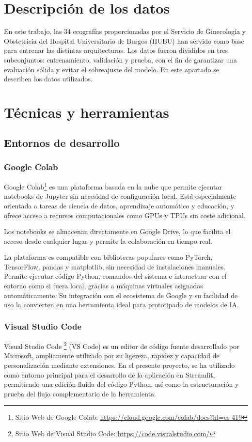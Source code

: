 
\section{Descripción de los datos}
En este trabajo, las 34 ecografías proporcionadas por el Servicio de Ginecología y Obstetricia del Hospital Universitario de Burgos (HUBU) han servido como base para entrenar las distintas arquitecturas. Los datos fueron divididos en tres subconjuntos: entrenamiento, validación y prueba, con el fin de garantizar una evaluación sólida y evitar el sobreajuste del modelo. En este apartado se describen los datos utilizados.
 
\section{Técnicas y herramientas}
\subsection{Entornos de desarrollo}
\subsubsection{Google Colab}
Google Colab\footnote{Sitio Web de Google Colab: \url{https://cloud.google.com/colab/docs?hl=es-419}} es una plataforma basada en la nube que permite ejecutar notebooks de Jupyter sin necesidad de configuración local. Está especialmente orientada a tareas de ciencia de datos, aprendizaje automático y educación, y ofrece acceso a recursos computacionales como GPUs y TPUs sin coste adicional. 

Los notebooks se almacenan directamente en Google Drive, lo que facilita el acceso desde cualquier lugar y permite la colaboración en tiempo real.

La plataforma es compatible con bibliotecas populares como PyTorch, TensorFlow, pandas y matplotlib, sin necesidad de instalaciones manuales. Permite ejecutar código Python, comandos del sistema e interactuar con el entorno como si fuera local, gracias a máquinas virtuales asignadas automáticamente. Su integración con el ecosistema de Google y su facilidad de uso la convierten en una herramienta ideal para prototipado de modelos de IA.

\subsubsection{Visual Studio Code}
Visual Studio Code \footnote{Sitio Web de Visual Studio Code: \url{https://code.visualstudio.com/}} (VS Code) es un editor de código fuente desarrollado por Microsoft, ampliamente utilizado por su ligereza, rapidez y capacidad de personalización mediante extensiones. En el presente proyecto, se ha utilizado como entorno principal para el desarrollo de la aplicación en Streamlit, permitiendo una edición fluida del código Python, así como la estructuración y prueba del flujo complementario de la herramienta.

